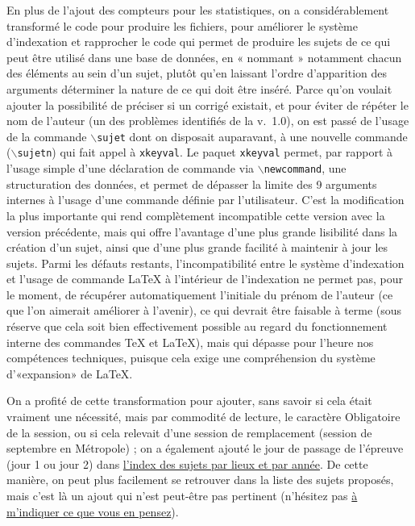 En plus de l'ajout des compteurs pour les statistiques, on a considérablement transformé le code pour produire les fichiers, pour améliorer le système d'indexation et rapprocher le code qui permet de produire les sujets de ce qui peut être utilisé dans une base de données, en « nommant »{} notamment chacun des éléments au sein d'un sujet, plutôt qu'en laissant l'ordre d'apparition des arguments déterminer la nature de ce qui doit être inséré. Parce qu'on voulait ajouter la possibilité de préciser si un corrigé existait, et pour éviter de répéter le nom de l'auteur (un des problèmes identifiés de la v.~1.0), on est passé de l'usage de la commande \texttt{$\backslash$sujet} dont on disposait auparavant, à une nouvelle commande (\texttt{$\backslash$sujetn}) qui fait appel à \texttt{xkeyval}. Le paquet \texttt{xkeyval} permet, par rapport à l'usage simple d'une déclaration de commande via \texttt{$\backslash$newcommand}, une structuration des données, et permet de dépasser la limite des 9 arguments internes à l'usage d'une commande définie par l'utilisateur. C'est la modification la plus importante qui rend complètement incompatible cette version avec la version précédente, mais qui offre l'avantage d'une plus grande lisibilité dans la création d'un sujet, ainsi que d'une plus grande facilité à maintenir à jour les sujets. Parmi les défauts restants, l'incompatibilité entre le système d'indexation et l'usage de commande \LaTeX{} à l'intérieur de l'indexation ne permet pas, pour le moment, de récupérer automatiquement l'initiale du prénom de l'auteur (ce que l'on aimerait améliorer à l'avenir), ce qui devrait être faisable à terme (sous réserve que cela soit bien effectivement possible au regard du fonctionnement interne des commandes \TeX{} et \LaTeX{}), mais qui dépasse pour l'heure nos compétences techniques, puisque cela exige une compréhension du système d'«{}expansion»{} de \LaTeX{}.

On a profité de cette transformation pour ajouter, sans savoir si cela était vraiment une nécessité, mais par commodité de lecture, le caractère Obligatoire de la session, ou si cela relevait d'une session de remplacement (session de septembre en Métropole) ; on a également ajouté le jour de passage de l'épreuve (jour 1 ou jour 2) dans \hyperlink{indexn}{l'index des sujets par lieux et par année}. De cette manière, on peut plus facilement se retrouver dans la liste des sujets proposés, mais c'est là un ajout qui n'est peut-être pas pertinent (n'hésitez pas \href{mailto:mikael.quesseveur@ac-lille.fr}{à m'indiquer ce que vous en pensez}).

